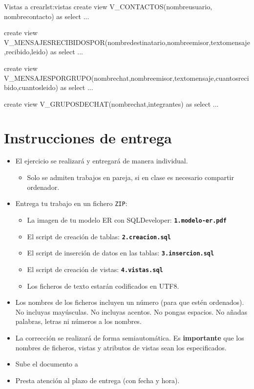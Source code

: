 \begin{homeworkProblem}
\begin{itemize}
  \begin{listadosql}{Vistas a crear}{lst:vistas}
  create view V_CONTACTOS(nombreusuario, nombrecontacto) as
  select ...
  
  create view V_MENSAJESRECIBIDOSPOR(nombredestinatario,nombreemisor,textomensaje,recibido,leido) as
  select ...
  
  create view V_MENSAJESPORGRUPO(nombrechat,nombreemisor,textomensaje,cuantosrecibido,cuantosleido) as
  select ...
    
  create view V_GRUPOSDECHAT(nombrechat,integrantes) as
  select ...
\end{listadosql}
    
\end{itemize}

\end{homeworkProblem}

\section{Instrucciones de entrega}
\begin{itemize}
\item El ejercicio se realizará y entregará de manera individual.
  \begin{itemize}
  \item Solo se admiten trabajos en pareja, si en clase es necesario compartir ordenador.
  \end{itemize}
\item Entrega tu trabajo en un fichero \texttt{ZIP}:
  \begin{itemize}
  \item La imagen de tu modelo ER  con SQLDeveloper: \texttt{\textbf{1.modelo-er.pdf}}
  \item El script de creación de tablas: \texttt{\textbf{2.creacion.sql}}
  \item El script de inserción de datos en las tablas: \texttt{\textbf{3.insercion.sql}}
  \item El script de creación de vistas: \texttt{\textbf{4.vistas.sql}}
  \item Los ficheros de texto estarán codificados en UTF8.
  \end{itemize}
\item Los nombres de los ficheros incluyen un número (para que estén ordenados). No incluyas mayúsculas. No incluyas acentos. No pongas espacios. No añadas palabras, letras ni números a los nombres.
  \item La corrección se realizará de forma semiautomática. Es \textbf{importante} que los nombres de ficheros, vistas y atributos de vistas sean los especificados.
\item Sube el documento a 
\item Presta atención al plazo de entrega (con fecha y hora).
  
\end{itemize}





